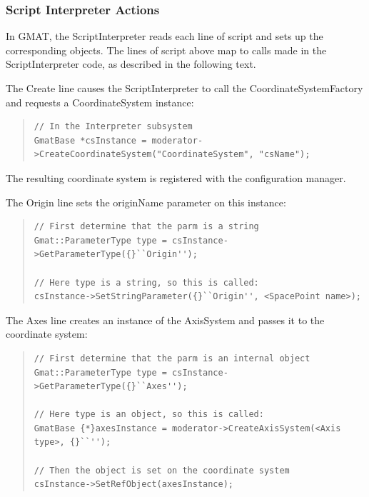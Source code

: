 \subsubsection{Script Interpreter Actions}

In GMAT, the ScriptInterpreter reads each line of script and sets up the corresponding objects. The
lines of script above map to calls made in the ScriptInterpreter code, as described in the following
text.

The Create line causes the ScriptInterpreter to call the CoordinateSystemFactory and requests a
CoordinateSystem instance:

\begin{quotation}
\begin{verbatim}
// In the Interpreter subsystem
GmatBase *csInstance = moderator->CreateCoordinateSystem("CoordinateSystem", "csName");
\end{verbatim}
\end{quotation}

The resulting coordinate system is registered with the configuration manager.

The Origin line sets the originName parameter on this instance:

\begin{quotation}
\begin{verbatim}
// First determine that the parm is a string
Gmat::ParameterType type = csInstance->GetParameterType({}``Origin'');

// Here type is a string, so this is called:
csInstance->SetStringParameter({}``Origin'', <SpacePoint name>);
\end{verbatim}
\end{quotation}

The Axes line creates an instance of the AxisSystem and passes it to the coordinate system:

\begin{quotation}
\begin{verbatim}
// First determine that the parm is an internal object
Gmat::ParameterType type = csInstance->GetParameterType({}``Axes'');

// Here type is an object, so this is called:
GmatBase {*}axesInstance = moderator->CreateAxisSystem(<Axis type>, {}``'');

// Then the object is set on the coordinate system
csInstance->SetRefObject(axesInstance);
\end{verbatim}
\end{quotation}

